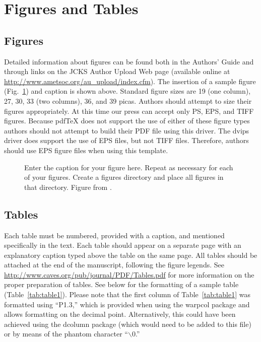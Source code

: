 \documentclass[12pt]{article}
\begin{document}
\section{Figures and Tables}

\subsection{Figures}
Detailed information about figures can be found both in the Authors' Guide and through links on the JCKS Author Upload Web page (available online at \url{http://www.ametsoc.org/au_upload/index.cfm}).  The insertion of a sample figure (Fig.~\ref{fig:figure1}) and caption is shown above.  Standard figure sizes are 19 (one column), 27, 30, 33 (two columns), 36, and 39 picas.  Authors should attempt to size their figures appropriately.  At this time our press can accept only PS, EPS, and TIFF figures.  Because pdfTeX does not support the use of either of these figure types authors should not attempt to build their PDF file using this driver.  The dvips driver does support the use of EPS files, but not TIFF files.  Therefore, authors should use EPS figure files when using this template.

\begin{figure}
\begin{center}
\caption{Enter the caption for your figure here.  Repeat as necessary for each of your figures.  Create a figures directory and place all figures in that directory.  Figure from \citet{fieldli10}.}
\label{fig:figure1}
\end{center}
\end{figure}

\subsection{Tables}
Each table must be numbered, provided with a caption, and mentioned specifically in the text.  Each table should appear on a separate page with an explanatory caption typed above the table on the same page.  All tables should be attached at the end of the manuscript, following the figure legends.  See \url{http://www.caves.org/pub/journal/PDF/Tables.pdf} for more information on the proper preparation of tables.  See below for the formatting of a sample table (Table~\ref{tab:table1}).  Please note that the first column of Table~\ref{tab:table1} was formatted using ``P{1.3},'' which is provided when using the warpcol package and allows formatting on the decimal point.  Alternatively, this could have been achieved using the dcolumn package (which would need to be added to this file) or by means of the phantom character ``$\backslash$0.''
\end{document}
